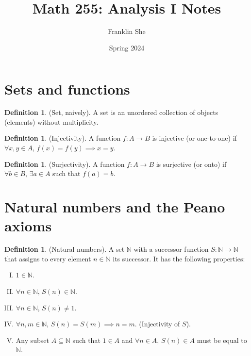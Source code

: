 \documentclass[10pt]{article}
\newcommand{\N}{\mathbb{N}}
\theoremstyle{definition}
\newtheorem{definition}[theorem]{Definition}
\theoremstyle{remark}
\begin{document}
\title{Math 255: Analysis I Notes}
\author{Franklin She}
\date{Spring 2024}

\maketitle
\tableofcontents

\newpage

\section{Sets and functions}

\begin{definition}
    (Set, naively).
    A set is an unordered collection of objects (elements) without multiplicity.
\end{definition}

\begin{definition}
    (Injectivity).
    A function $f: A \to B$ is injective (or one-to-one) if $\forall x, y \in A$, $f(x) = f(y) \implies x = y$.
\end{definition}

\begin{definition}
    (Surjectivity).
    A function $f: A \to B$ is surjective (or onto) if $\forall b \in B$, $\exists a \in A$ such that $f(a) = b$.
\end{definition}



\section{Natural numbers and the Peano axioms}

\begin{definition}
    (Natural numbers).
    A set $\N$ with a successor function $S: \N \to \N$ that assigns to every element $n \in \N$ its successor. It has the following properties:
    \begin{enumerate}[I.]
        \item $1 \in \N$.
        \item $\forall n \in \N$, $S(n) \in \N$.
        \item $\forall n \in \N$, $S(n) \neq 1$.
        \item $\forall n, m \in \N$, $S(n) = S(m) \implies n = m$. (Injectivity of $S$).
        \item Any subset $A \subseteq \N$ such that $1 \in A$ and $\forall n \in A$, $S(n) \in A$ must be equal to $\N$.
    \end{enumerate}
\end{definition}
\end{document}

